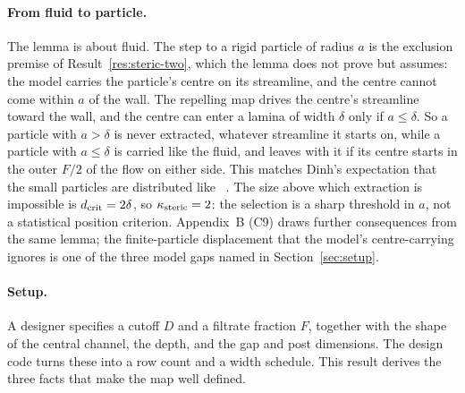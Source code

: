\paragraph{From fluid to particle.} The lemma is about fluid. The step to a rigid particle of
radius $a$ is the exclusion premise of Result~\ref{res:steric-two}, which the lemma does not prove
but assumes: the model carries the particle's centre on its streamline, and the centre cannot
come within $a$ of the wall. The repelling map drives the centre's streamline toward the wall, and
the centre can enter a lamina of width $\delta$ only if $a\le\delta$. So a particle with $a>\delta$
is never extracted, whatever streamline it starts on, while a particle with $a\le\delta$ is carried
like the fluid, and leaves with it if its centre starts in the outer $F/2$ of the flow on either
side. This matches Dinh's expectation that the small particles are distributed like
~\cite[p.~917]{b5}. The size above which extraction is
impossible is $d_{\mathrm{crit}}=2\delta$, so $\kappa_{\mathrm{steric}}=2$: the selection is a sharp threshold in $a$, not a
statistical position criterion. Appendix~B (C9) draws further consequences from the
same lemma; the finite-particle displacement that the model's centre-carrying ignores is one of
the three model gaps named in Section~\ref{sec:setup}.

\label{res:design-map}

\paragraph{Setup.} A designer specifies a cutoff $D$ and a filtrate fraction $F$, together with
the shape of the central channel, the depth, and the gap and post dimensions. The design code
turns these into a row count and a width schedule. This result derives the three facts that
make the map well defined.

